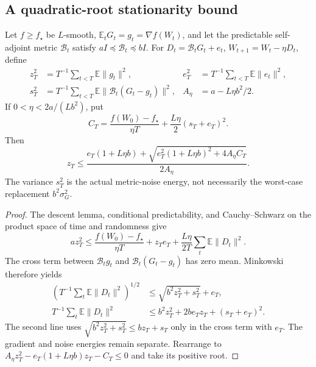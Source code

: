 \subsection{A quadratic-root stationarity bound}
\label{app:sharp-descent}

\begin{proposition}
\label{prop:root-stationarity}
Let $f\ge f_\star$ be $L$-smooth, $\mathbb E_tG_t=g_t=\nabla f(W_t)$,
and let the predictable self-adjoint metric $\mathcal B_t$ satisfy
$aI\preceq\mathcal B_t\preceq bI$. For
$D_t=\mathcal B_tG_t+e_t$, $W_{t+1}=W_t-\eta D_t$, define
\begin{align}
 z_T^2&=T^{-1}\sum_{t<T}\mathbb E\|g_t\|^2,&
 e_T^2&=T^{-1}\sum_{t<T}\mathbb E\|e_t\|^2,\\
 s_T^2&=T^{-1}\sum_{t<T}\mathbb E
                   \|\mathcal B_t(G_t-g_t)\|^2,&
 A_\eta&=a-L\eta b^2/2.
\end{align}
If $0<\eta<2a/(Lb^2)$, put
\begin{equation}
 C_T=\frac{f(W_0)-f_\star}{\eta T}
                          +\frac{L\eta}{2}(s_T+e_T)^2.
\end{equation}
Then
\begin{equation}
 z_T\le\frac{e_T(1+L\eta b)+
       \sqrt{e_T^2(1+L\eta b)^2+4A_\eta C_T}}{2A_\eta}.
 \label{eq:root-stationarity}
\end{equation}
The variance $s_T^2$ is the actual metric-noise energy, not necessarily the
worst-case replacement $b^2\sigma_G^2$.
\end{proposition}
\begin{proof}
The descent lemma, conditional predictability, and Cauchy--Schwarz on the
product space of time and randomness give
\begin{equation}
 a z_T^2\le\frac{f(W_0)-f_\star}{\eta T}
                +z_Te_T+\frac{L\eta}{2T}\sum_t\mathbb E\|D_t\|^2.
\end{equation}
The cross term between $\mathcal B_tg_t$ and
$\mathcal B_t(G_t-g_t)$ has zero mean. Minkowski therefore yields
\begin{align}
 \left(T^{-1}\sum_t\mathbb E\|D_t\|^2\right)^{1/2}
 &\le\sqrt{b^2z_T^2+s_T^2}+e_T,\\
 T^{-1}\sum_t\mathbb E\|D_t\|^2
 &\le b^2z_T^2+2be_Tz_T+(s_T+e_T)^2.
\end{align}
The second line uses $\sqrt{b^2z_T^2+s_T^2}\le bz_T+s_T$ only in the
cross term with $e_T$. The gradient and noise energies remain separate.
Rearrange to $A_\eta z_T^2-e_T(1+L\eta b)z_T-C_T\le0$
and take its positive root.
\end{proof}


